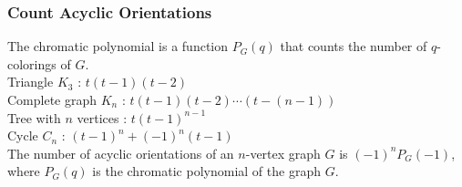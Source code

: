 \subsubsection{Count Acyclic Orientations}
    \noindent
    The chromatic polynomial is a function $P_G(q)$ that counts the number of $q$-colorings of $G$.\\
    Triangle $K_3$ : $t(t-1)(t-2)$\\
    Complete graph $K_n$ : $t(t-1)(t-2)\cdots (t-(n-1))$\\
    Tree with $n$ vertices : $t(t-1)^{n-1}$\\
    Cycle $C_n$ : $(t-1)^{n}+(-1)^{n}(t-1)$\\
    The number of acyclic orientations of an $n$-vertex graph $G$ is $(−1)^nP_G(−1)$, where $P_G(q)$ is the chromatic polynomial of the graph
    $G$.
